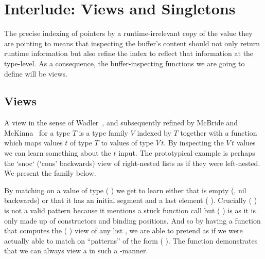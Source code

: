 
\section{Interlude: Views and Singletons}\label{sec:view}

The precise indexing of pointers by a runtime-irrelevant copy of the value
they are pointing to means that inspecting the buffer's content should
not only return runtime information but also refine the index to reflect
that information at the type-level.
%
As a consequence, the buffer-inspecting functions we are going to define
will be views.

\subsection{Views}

A view
in the sense of Wadler~\citep{DBLP:conf/popl/Wadler87},
and subsequently refined by McBride and McKinna~\citep{DBLP:journals/jfp/McBrideM04}
for a type $T$ is a type family $V$ indexed by $T$ together
with a function which maps values $t$ of type $T$ to values of type
$V\,t$.
%
By inspecting the $V\,t$ values we can learn something about the
$t$ input.
%
The prototypical example is perhaps the `snoc` (`cons' backwards) view
of right-nested lists as if they were left-nested.
We present the  family below.


By matching on a value of type
( ) we get to learn
either that  is empty (, nil backwards)
or that it has an initial segment  and a last element
 ( \IdrisData{:<} ).
%
Crucially ( \IdrisFunction{++} \IdrisData{[}\IdrisData{]})
is not a valid pattern because it mentions a stuck function call
but ( \IdrisData{:<} ) is as
it is only made up of constructors and binding positions.
%
And so by having a function that computes the ( )
view of any list , we are able to pretend as if we were
actually able to match on ``patterns'' of the form
( \IdrisFunction{++} \IdrisData{[}\IdrisData{]}).
%
The function  demonstrates that we can always
view a  in such a -manner.


